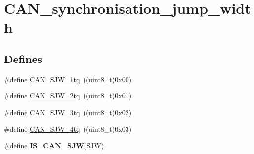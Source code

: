 \hypertarget{group__CAN__synchronisation__jump__width}{
\section{CAN\_\-synchronisation\_\-jump\_\-width}
\label{group__CAN__synchronisation__jump__width}
}
\subsection*{Defines}
\begin{DoxyCompactItemize}
\item 
\#define \hyperlink{group__CAN__synchronisation__jump__width_ga4e03d22ae683b63cb4df238449ec967c}{CAN\_\-SJW\_\-1tq}~((uint8\_\-t)0x00)
\item 
\#define \hyperlink{group__CAN__synchronisation__jump__width_gad39e7656c555cc00bc4d7c1bff39916f}{CAN\_\-SJW\_\-2tq}~((uint8\_\-t)0x01)
\item 
\#define \hyperlink{group__CAN__synchronisation__jump__width_gab4de740e2184aac71c2c8cba22a8ecd2}{CAN\_\-SJW\_\-3tq}~((uint8\_\-t)0x02)
\item 
\#define \hyperlink{group__CAN__synchronisation__jump__width_ga7f26a36d478c7ba1a1441b369d62f693}{CAN\_\-SJW\_\-4tq}~((uint8\_\-t)0x03)
\item 
\#define {\bfseries IS\_\-CAN\_\-SJW}(SJW)
\end{DoxyCompactItemize}


